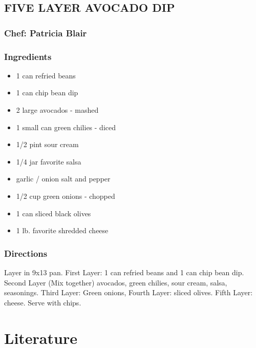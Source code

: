 \documentclass[
]{book}
\providecommand{\tightlist}{%
  \setlength{\itemsep}{0pt}\setlength{\parskip}{0pt}}
\begin{document}
\hypertarget{five-layer-avocado-dip}{%
\section*{FIVE LAYER AVOCADO DIP}\label{five-layer-avocado-dip}}

\hypertarget{chef-patricia-blair-2}{%
\subsection*{Chef: Patricia Blair}\label{chef-patricia-blair-2}}

\hypertarget{ingredients-5}{%
\subsection*{Ingredients}\label{ingredients-5}}

\begin{itemize}
\tightlist
\item
  1 can refried beans
\item
  1 can chip bean dip
\item
  2 large avocados - mashed
\item
  1 small can green chilies - diced
\item
  1/2 pint sour cream
\item
  1/4 jar favorite salsa
\item
  garlic / onion salt and pepper
\item
  1/2 cup green onions - chopped
\item
  1 can sliced black olives
\item
  1 lb. favorite shredded cheese
\end{itemize}

\hypertarget{directions-5}{%
\subsection*{Directions}\label{directions-5}}

Layer in 9x13 pan. First Layer: 1 can refried beans and 1 can chip bean dip.
Second Layer (Mix together) avocados, green chilies, sour cream, salsa, seasonings.
Third Layer: Green onions, Fourth Layer: sliced olives.
Fifth Layer: cheese. Serve with chips.

\hypertarget{literature}{%
\chapter{Literature}\label{literature}}
\end{document}
